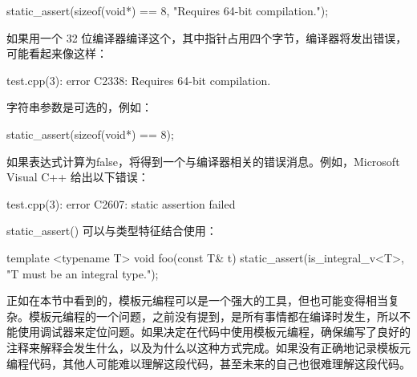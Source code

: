 \begin{cpp}
static_assert(sizeof(void*) == 8, "Requires 64-bit compilation.");
\end{cpp}

如果用一个 32 位编译器编译这个，其中指针占用四个字节，编译器将发出错误，可能看起来像这样：

\begin{shell}
test.cpp(3): error C2338: Requires 64-bit compilation.
\end{shell}

字符串参数是可选的，例如：

\begin{cpp}
static_assert(sizeof(void*) == 8);
\end{cpp}

如果表达式计算为false，将得到一个与编译器相关的错误消息。例如，Microsoft Visual C++ 给出以下错误：

\begin{shell}
test.cpp(3): error C2607: static assertion failed
\end{shell}

static\_assert() 可以与类型特征结合使用：

\begin{cpp}
template <typename T>
void foo(const T& t)
{
    static_assert(is_integral_v<T>, "T must be an integral type.");
}
\end{cpp}


正如在本节中看到的，模板元编程可以是一个强大的工具，但也可能变得相当复杂。模板元编程的一个问题，之前没有提到，是所有事情都在编译时发生，所以不能使用调试器来定位问题。如果决定在代码中使用模板元编程，确保编写了良好的注释来解释会发生什么，以及为什么以这种方式完成。如果没有正确地记录模板元编程代码，其他人可能难以理解这段代码，甚至未来的自己也很难理解这段代码。






















